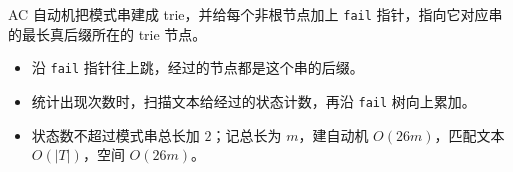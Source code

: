 AC 自动机把模式串建成 trie，并给每个非根节点加上 \texttt{fail} 指针，指向它对应串的最长真后缀所在的 trie 节点。

\begin{itemize}
  \item 沿 \texttt{fail} 指针往上跳，经过的节点都是这个串的后缀。
  \item 统计出现次数时，扫描文本给经过的状态计数，再沿 \texttt{fail} 树向上累加。
  \item 状态数不超过模式串总长加 $2$；记总长为 $m$，建自动机 $O(26m)$，匹配文本 $O(|T|)$，空间 $O(26m)$。
\end{itemize}
